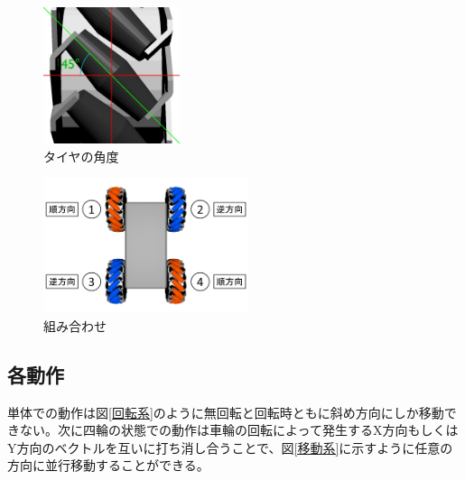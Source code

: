 \documentclass[twocolumn,11pt]{sotsuken_abst}
\begin{document}
	\begin{figure}[htp]
		\begin{center}
			\includegraphics[width=40mm]{Image/角度.jpg}
			\caption{タイヤの角度}
			\label{角度}
		\end{center}
	\end{figure}

	\begin{figure}[htp]
		\begin{center}
			\includegraphics[width=60mm]{Image/対角.png}
			\caption{組み合わせ}
			\label{対角}
		\end{center}
	\end{figure}

	\subsection{各動作}
	単体での動作は図\ref{回転系}のように無回転と回転時ともに斜め方向にしか移動できない。次に四輪の状態での動作は車輪の回転によって発生するX方向もしくはY方向のベクトルを互いに打ち消し合うことで、図\ref{移動系}に示すように任意の方向に並行移動することができる。
\end{document}
